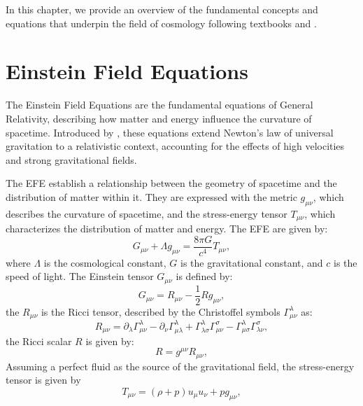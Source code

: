 In this chapter, we provide an overview of the fundamental concepts and equations that underpin the field of cosmology following textbooks \citet{2003moco.book.....D} and \citet{2008cosm.book.....W}.

\section{Einstein Field Equations}
The Einstein Field Equations are the fundamental equations of General Relativity, describing how matter and energy influence the curvature of spacetime. Introduced by \citet{1915SPAW.......844E}, these equations extend Newton's law of universal gravitation to a relativistic context, accounting for the effects of high velocities and strong gravitational fields.

The EFE establish a relationship between the geometry of spacetime and the distribution of matter within it. They are expressed with the metric $g_{\mu\nu}$, which describes the curvature of spacetime, and the stress-energy tensor $T_{\mu\nu}$, which characterizes the distribution of matter and energy. The EFE are given by:
\begin{equation}
    G_{\mu\nu} + \Lambda g_{\mu\nu}= \frac{8\pi G}{c^4} T_{\mu\nu},
    \label{eq:einstein_field_equations}
\end{equation}
where $\Lambda$ is the cosmological constant, $G$ is the gravitational constant, and $c$ is the speed of light. The Einstein tensor $G_{\mu\nu}$ is defined by:
\begin{equation}
    G_{\mu\nu} = R_{\mu\nu} - \frac{1}{2} R g_{\mu\nu},
    \label{eq:einstein_tensor}
\end{equation}
the $R_{\mu\nu}$ is the Ricci tensor, described by the Christoffel symbols $\Gamma^\lambda_{\mu\nu}$ as:
\begin{equation}
    R_{\mu\nu} = \partial_\lambda \Gamma^\lambda_{\mu\nu} - \partial_\nu \Gamma^\lambda_{\mu\lambda} + \Gamma^\lambda_{\lambda\sigma} \Gamma^\sigma_{\mu\nu} - \Gamma^\lambda_{\mu\sigma} \Gamma^\sigma_{\lambda\nu},
    \label{eq:ricci_curvature_tensor}
\end{equation}
the Ricci scalar $R$ is given by:
\begin{equation}
    R = g^{\mu\nu} R_{\mu\nu},
    \label{eq:ricci_scalar}
\end{equation}
Assuming a perfect fluid as the source of the gravitational field, the stress-energy tensor is given by
\begin{equation}
    T_{\mu\nu} = \left(\rho + p \right) u_{\mu} u_{\nu} + p g_{\mu\nu},
    \label{eq:stress_energy_tensor}
\end{equation}

